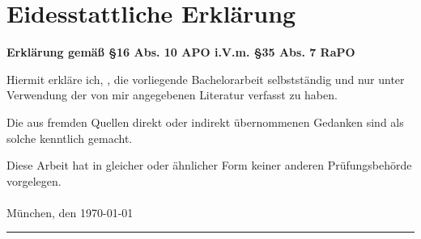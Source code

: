 \chapter{Eidesstattliche Erklärung}

\textbf{Erklärung gemäß \S 16 Abs. 10 APO i.V.m. \S 35 Abs. 7 RaPO}

Hiermit erkläre ich, \Author, die vorliegende Bachelorarbeit selbstständig und nur unter Verwendung der von mir angegebenen Literatur verfasst zu haben. 

Die aus fremden Quellen direkt oder indirekt übernommenen Gedanken sind als solche kenntlich gemacht.

Diese Arbeit hat in gleicher oder ähnlicher Form keiner anderen Prüfungsbehörde vorgelegen.\\
\\[6ex]

München, den \today 


\rule[-0.2cm]{5cm}{0.5pt}

\textsc{\Author} 

